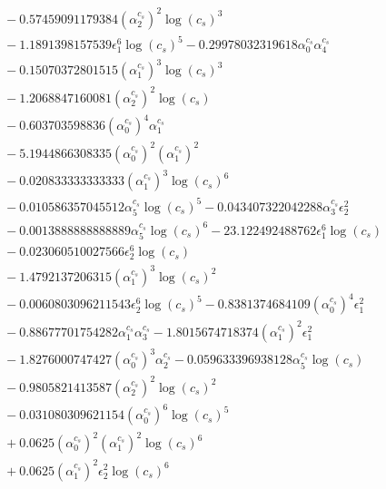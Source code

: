 \documentclass[10pt]{article}
\begin{document}
\begin{align*}
&{}  - 0.57459091179384 \left(\alpha_{2}^{c_s}\right)^{2} \log{\left(c_{s} \right)}^{3} \\
&{}  - 1.1891398157539 \epsilon_{1}^{6} \log{\left(c_{s} \right)}^{5} - 0.29978032319618 \alpha_{0}^{c_s} \alpha_{4}^{c_s} \\
&{}  - 0.15070372801515 \left(\alpha_{1}^{c_s}\right)^{3} \log{\left(c_{s} \right)}^{3} \\
&{}  - 1.2068847160081 \left(\alpha_{2}^{c_s}\right)^{2} \log{\left(c_{s} \right)} \\
&{}  - 0.603703598836 \left(\alpha_{0}^{c_s}\right)^{4} \alpha_{1}^{c_s} \\
&{}  - 5.1944866308335 \left(\alpha_{0}^{c_s}\right)^{2} \left(\alpha_{1}^{c_s}\right)^{2} \\
&{}  - 0.020833333333333 \left(\alpha_{1}^{c_s}\right)^{3} \log{\left(c_{s} \right)}^{6} \\
&{}  - 0.010586357045512 \alpha_{5}^{c_s} \log{\left(c_{s} \right)}^{5} - 0.043407322042288 \alpha_{3}^{c_s} \epsilon_{2}^{2} \\
&{}  - 0.0013888888888889 \alpha_{5}^{c_s} \log{\left(c_{s} \right)}^{6} - 23.122492488762 \epsilon_{1}^{6} \log{\left(c_{s} \right)} \\
&{}  - 0.023060510027566 \epsilon_{2}^{6} \log{\left(c_{s} \right)} \\
&{}  - 1.4792137206315 \left(\alpha_{1}^{c_s}\right)^{3} \log{\left(c_{s} \right)}^{2} \\
&{}  - 0.0060803096211543 \epsilon_{2}^{6} \log{\left(c_{s} \right)}^{5} - 0.8381374684109 \left(\alpha_{0}^{c_s}\right)^{4} \epsilon_{1}^{2} \\
&{}  - 0.88677701754282 \alpha_{1}^{c_s} \alpha_{3}^{c_s} - 1.8015674718374 \left(\alpha_{1}^{c_s}\right)^{2} \epsilon_{1}^{2} \\
&{}  - 1.8276000747427 \left(\alpha_{0}^{c_s}\right)^{3} \alpha_{2}^{c_s} - 0.059633396938128 \alpha_{5}^{c_s} \log{\left(c_{s} \right)} \\
&{}  - 0.9805821413587 \left(\alpha_{2}^{c_s}\right)^{2} \log{\left(c_{s} \right)}^{2} \\
&{}  - 0.031080309621154 \left(\alpha_{0}^{c_s}\right)^{6} \log{\left(c_{s} \right)}^{5} \\
&{}  + 0.0625 \left(\alpha_{0}^{c_s}\right)^{2} \left(\alpha_{1}^{c_s}\right)^{2} \log{\left(c_{s} \right)}^{6} \\
&{}  + 0.0625 \left(\alpha_{1}^{c_s}\right)^{2} \epsilon_{2}^{2} \log{\left(c_{s} \right)}^{6} \\

\end{align*}
\end{document}
